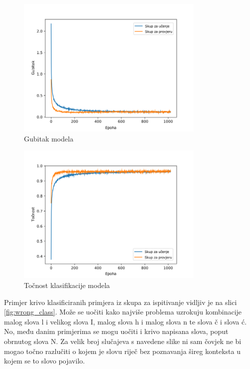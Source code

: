 \begin{figure}[!ht]
    \centering
    \includegraphics[width=9cm]{images/loss_joined.png}
    \caption{Gubitak modela}
    \label{fig:model_loss_joined}
\end{figure}

\begin{figure}[!ht]
    \centering
    \includegraphics[width=9cm]{images/acc_joined.png}
    \caption{Točnost klasifikacije modela}
    \label{fig:model_acc_joined}
\end{figure}

Primjer krivo klasificiranih primjera iz skupa za ispitivanje vidljiv je na slici \ref{fig:wrong_class}. Može se uočiti kako najviše problema uzrokuju kombinacije malog slova l i velikog slova I, malog slova h i malog slova n te slova č i slova ć. No, među danim primjerima se mogu uočiti i krivo napisana slova, poput obrnutog slova N. Za velik broj slučajeva s navedene slike ni sam čovjek ne bi mogao točno razlučiti o kojem je slovu riječ bez poznavanja šireg konteksta u kojem se to slovo pojavilo.

